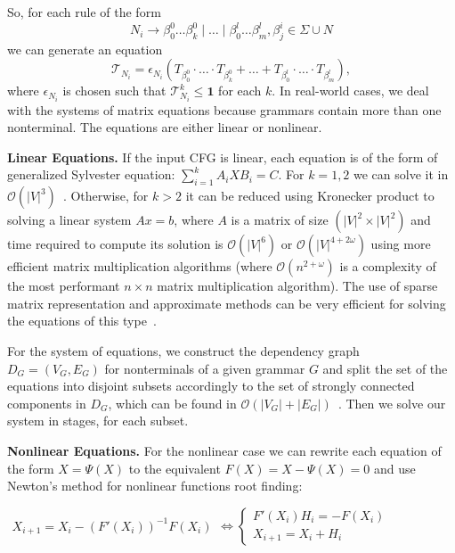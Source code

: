 \documentclass[sigconf]{acmart}
\begin{document}
So, for each rule of the form $$N_i \to \beta^0_0 \dots \beta^0_k \mid \ldots \mid \beta^l_0 \dots \beta^l_m, \beta^i_j \in \Sigma \cup N$$ we can generate an equation
$$\mathcal{T}_{N_i} = \epsilon_{N_i}(T_{\beta^0_0}\cdot \ldots \cdot T_{\beta^0_k} + \ldots + T_{\beta^l_0}\cdot \ldots \cdot T_{\beta^l_m}), $$ where $\epsilon_{N_i}$ is chosen such that $\mathcal{T}_{N_i}^{k} \leq \textbf{1}$ for each $k$.
In real-world cases, we deal with the systems of matrix equations because grammars contain more than one nonterminal.
The equations are either linear or nonlinear.

\textbf{Linear Equations.}
If the input CFG is linear, each equation is of the form of generalized Sylvester equation: $\sum_{i = 1}^{k} A_iXB_i = C$.
For $k = 1, 2$ we can solve it in $\mathcal{O}(|V|^3)$~\cite{Bartels:1972:SME:361573.361582}.
Otherwise, for $k > 2$ it can be reduced using Kronecker product to solving a linear system $Ax = b$, where $A$ is a matrix of size $(|V|^2 \times |V|^2)$ and time required to compute its solution is $\mathcal{O}(|V|^6)$ or $\mathcal{O}(|V|^{4 + 2\omega})$ using more efficient matrix multiplication algorithms (where $\mathcal{O}(n^{2+\omega})$ is a complexity of the most performant $n\times n$ matrix multiplication algorithm).
The use of sparse matrix representation and approximate methods can be very efficient for solving the equations of this type~\cite{bouhamidi2008}.

For the system of equations, we construct the dependency graph $D_G = (V_G, E_G)$ for nonterminals of a given grammar $G$ and split the set of the equations into disjoint subsets accordingly to the set of strongly connected components in $D_G$, which can be found in $\mathcal{O}(|V_G| + |E_G|)$~\cite{tarjan1972}.
Then we solve our system in stages, for each subset.

\textbf{Nonlinear Equations.}
For the nonlinear case we can rewrite each equation of the form $X = \Psi(X)$ to the equivalent $F(X) = X - \Psi(X) = 0$ and use Newton's method for nonlinear functions root finding:

\begin{center}

\(
\left.
\begin{array}{l}
X_{i+1} = X_i - (F'(X_i))^{-1}F(X_i)
\end{array}
\right.
\iff
\left\{
\begin{array}{l}
F'(X_i)H_i = - F(X_i) \\
X_{i+1} = X_i + H_i
\end{array}
\right.
\)
\end{center}
\end{document}
